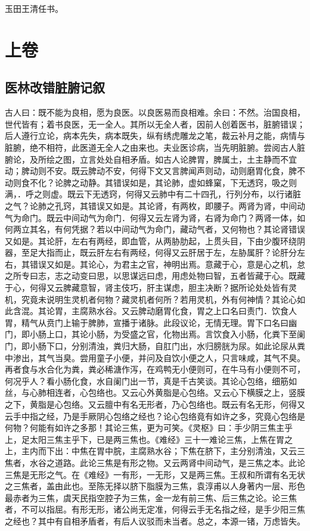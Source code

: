 \documentclass[a4paper,12pt,UTF8,twoside]{ctexbook}
\begin{document}
	玉田王清任书。
	
	
	\mainmatter
	\part{上卷}
	\chapter{医林改错脏腑记叙}
	
	
	古人曰：既不能为良相，愿为良医。以良医易而良相难。余曰：不然。治国良相，世代皆有；着书良医，无一全人。其所以无全人者，因前人创着医书，脏腑错误；后人遵行立论，病本先失，病本既失，纵有绣虎雕龙之笔，裁云补月之能，病情与脏腑，绝不相符，此医道无全人之由来也。夫业医诊病，当先明脏腑。尝阅古人脏腑论，及所绘之图，立言处处自相矛盾。如古人论脾胃，脾属土，土主静而不宜动；脾动则不安。既云脾动不安，何得下文又言脾闻声则动，动则磨胃化食，脾不动则食不化？论脾之动静。其错误如是，其论肺，虚如蜂窠，下无透窍，吸之则满，．呼之则虚。既云下无透窍，何得又云肺中有二十四孔，行列分布，以行诸脏之气？论肺之孔窍，其错误又如是。其论肾，有两枚，即腰子。两肾为肾，中间动气为命门。既云中间动气为命门．何得又云左肾为肾，右肾为命门？两肾一体，如何两立其名，有何凭据？若以中间动气为命门，藏动气者，又何物也？其论肾错误又如是。其论肝，左右有两经，即血管，从两胁肋起，上贯头目，下由少腹环绕阴器，至足大指而止，既云肝左右有两经，何得又云肝居于左，左胁属肝？论肝分左右，其错误又如是。其论心，为君主之官，神明出焉。意藏于心，意是心之机，怠之所专曰志，志之动变曰思，以思谋远曰虑，用虑处物曰智，五者皆藏于心。既藏于心，何得又云脾藏意智，肾主伎巧，肝主谋虑，胆主决断？据所论处处皆有灵机，究竟未说明生灵机者何物？藏灵机者何所？若用灵机，外有何神情？其论心如此含混。其论胃，主腐熟水谷。又云脾动磨胃化食，胃之上口名曰责门．饮食人胃，精气从贲门上输于脾肺，宣播于诸脉。此段议论，无情无理。胃下口名曰幽门，即小肠上口，其论小肠，为受盛之官，化物出焉。言饮食入小肠，化粪下至阑门，即小肠下口，分别清浊，粪归大肠，自肛门出，水归膀胱为尿。如此论尿从粪中渗出，其气当臭。尝用童子小便，并问及自饮小便之人，只言味咸，其气不臭。再者食与水合化为粪，粪必稀溏作泻，在鸡鸭无小便则可，在牛马有小便则不可，何况乎人？看小肠化食，水自阑门出一节，真是千古笑谈。其论心包络，细筋如丝，与心肺相连者，心包络也。又云心外黄脂是心包络。又云心下横膜之上，竖膜之下，黄脂是心包络。又云膻中有名无形者，乃心包络也。既云有名无形，何得又云手中指之经，乃是手厥阴心包络之经也？论心包络竟有如许之多，究竟心包络是何物？何能有如许之多那！其论三焦，更为可笑。《灵枢》曰：手少阴三焦主乎上，足太阳三焦主乎下，已是两三焦也。《难经》三十一难论三焦，上焦在胃之上，主内而下出：中焦在胃中脘，主腐熟水谷；下焦在脐下，主分别清浊，又云三焦者，水谷之道路。此论三焦是有形之物。又云两肾中间动气，是三焦之本。此论三焦是无形之气。在《难经》一有形，一无形，又是两三焦。王叔和所谓有名无状之三焦者，盖由此也。至陈无择以脐下脂膜为三焦，袁淳甫以人身著内一层、形色最赤者为三焦，虞天民指空腔子为三焦，金一龙有前三焦、后三焦之论。论三焦者，不可以指屈。有形无形，诸公尚无定准，何得云手无名指之经，是手少阳三焦之经也？其中有自相矛盾者，有后人议驳而未当者。总之，本源一锗，万虑皆失。
	
\end{document}
